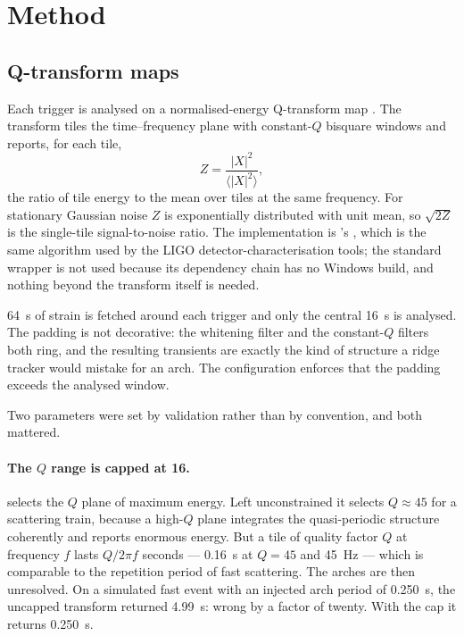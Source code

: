\section{Method}
\label{sec:methods}

\subsection{Q-transform maps}
\label{sec:methods:qscan}

Each trigger is analysed on a normalised-energy Q-transform map
\citep{Chatterji2004}. The transform tiles the time--frequency plane with
constant-$Q$ bisquare windows and reports, for each tile,
%
\begin{equation}
  Z = \frac{|X|^2}{\langle |X|^2 \rangle},
  \label{eq:normenergy}
\end{equation}
%
the ratio of tile energy to the mean over tiles at the same frequency. For
stationary Gaussian noise $Z$ is exponentially distributed with unit mean, so
$\sqrt{2Z}$ is the single-tile signal-to-noise ratio. The implementation is
's  \citep{Macleod2021GWpy}, which is the same
algorithm used by the LIGO detector-characterisation tools; the standard
 wrapper is not used because its dependency chain has no
Windows build, and nothing beyond the transform itself is needed.

\SI{64}{\second} of strain is fetched around each trigger and only the central
\SI{16}{\second} is analysed. The padding is not decorative: the whitening
filter and the constant-$Q$ filters both ring, and the resulting transients
are exactly the kind of structure a ridge tracker would mistake for an arch.
The configuration enforces that the padding exceeds the analysed window.

Two parameters were set by validation rather than by convention, and both
mattered.

\paragraph{The $Q$ range is capped at 16.}  selects the $Q$ plane of
maximum energy. Left unconstrained it selects $Q \approx 45$ for a scattering
train, because a high-$Q$ plane integrates the quasi-periodic structure
coherently and reports enormous energy. But a tile of quality factor $Q$ at
frequency $f$ lasts $Q/2\pi f$ seconds --- \SI{0.16}{\second} at $Q = 45$ and
\SI{45}{\hertz} --- which is comparable to the repetition period of fast
scattering. The arches are then unresolved. On a simulated fast event with an
injected arch period of \SI{0.250}{\second}, the uncapped transform returned
\SI{4.99}{\second}: wrong by a factor of twenty. With the cap it returns
\SI{0.250}{\second}.

